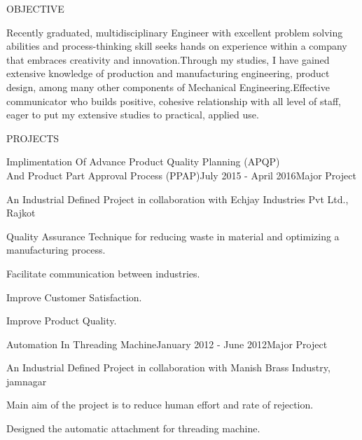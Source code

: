 \documentclass{resume} %
\begin{document}

\begin{rSection}{OBJECTIVE}

{Recently graduated, multidisciplinary Engineer with excellent problem solving abilities and process-thinking skill seeks hands on experience within a company that embraces creativity and innovation.Through my studies, I have gained extensive knowledge of production and manufacturing engineering, product design, among many other components of  Mechanical Engineering.Effective communicator who builds positive, cohesive relationship with all level of staff, eager to put my extensive studies to practical, applied use.}


\end{rSection}



\begin{rSection}{PROJECTS}

\begin{rSubsection}{Implimentation Of Advance Product Quality Planning (APQP) \\ And Product Part Approval Process (PPAP)}{July 2015 - April 2016}{Major Project}{} 
\item An Industrial Defined Project in collaboration with Echjay Industries Pvt Ltd., Rajkot
\item Quality Assurance Technique for reducing waste in material and optimizing a
manufacturing process.
\item Facilitate communication between industries.
\item Improve Customer Satisfaction.
\item Improve Product Quality.
 
\end{rSubsection} 



\begin{rSubsection}{Automation In Threading Machine}{January 2012 - June 2012}{Major Project}{}
\item An Industrial Defined Project in collaboration with Manish Brass Industry, jamnagar
\item Main aim of the project is to reduce human effort and rate of rejection.
\item Designed the automatic attachment for threading machine.
\end{rSubsection}


\end{rSection} 
\end{document}
